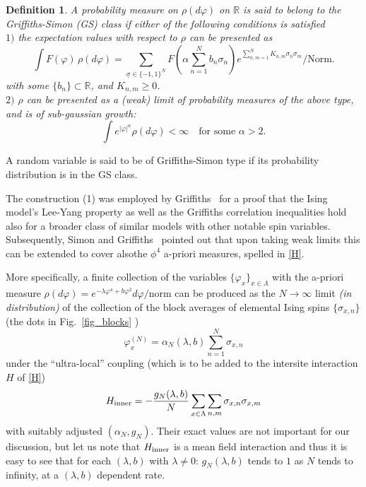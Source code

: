 \documentclass[a4paper,oneside,11pt]{article}
\def\R{\mathbb{R}}
\newtheorem{definition}[theorem]{Definition}
\newcommand{\be}[1]{\begin{equation}\label{#1}}
\newcommand{\ee}{\end{equation}}
\numberwithin{equation}{section}
\numberwithin{equation}{section}
\numberwithin{equation}{section}
\def\be{\begin{equation}}
\def\ee{\end{equation}}
\begin{document}
\begin{definition} \label{def:rho}
A probability measure on  $\rho(d\varphi) $ on $\R$ is said to belong to the Griffiths-Simon (GS) class if either  of the following conditions is satisfied 
\\  
\indent $1)$   the expectation values with respect to $\rho$ can be presented as 
\be 
\int F(\varphi) \, \rho(d\varphi)  =   \sum_{\underline{\sigma}\in \{-1,1\}^N} F(\alpha \sum_{n=1}^N b_n \sigma_n) e^{\sum_{n,m=1}^N  K_{n,m} \sigma_n \sigma_m} / \text{Norm.}
\ee 
with some $\{b_n\}\subset \R$, and $K_{n,m}  \geq 0$.   \\  
\indent $2) $   $\rho$ can be presented as a (weak) limit of probability measures of  the above type, and is of sub-gaussian growth: 
\be \label{sub_gauss}
\int e^{|\varphi |^\alpha} \rho(d \varphi ) < \infty \quad \mbox{for some $\alpha> 2$.}
\ee 
\end{definition} 
A random variable is said to be of  Griffiths-Simon type if its probability distribution is in the GS class.   



The construction  (1) was employed  by 
Griffiths~\cite{Gri69} 
for a proof  that the Ising model's Lee-Yang property as well as the Griffiths correlation inequalities hold also for a broader class of similar models with other notable spin variables.  Subsequently, Simon and Griffiths~\cite{SimGri73} pointed out that upon taking weak limits this can be extended to cover alsothe $\phi^4$ a-priori  measures, spelled in \eqref{H}.  

More specifically, a finite collection of the variables $\{\varphi_x\}_{x\in \Lambda}$ with the a-priori measure $\rho(d\varphi) = e^{-\lambda \varphi^4 + b\varphi^2} d\varphi/\text{norm} $   
can be produced as the $N\to \infty$ limit \emph{(in distribution)}  of the collection of the block averages of elemental Ising spins $\{\sigma_{x,n}\}$ (the dots  in Fig.~\ref{fig_blocks} )
\be
\varphi_x^{(N)} =   \alpha_N(\lambda, b) \sum_{n=1}^N \sigma_{x,n}
\ee 
 under the ``ultra-local'' coupling (which is to be added to the intersite interaction $H$ of \eqref{H})  
\be
H_{\rm inner}  = -  \frac{g_N(\lambda,b)}{N }  \sum_{x\in \Lambda} 
\sum_{n,m} \sigma_{x,n} \sigma_{x,m}
\ee 
with suitably adjusted $(\alpha_N, g_N)$.  Their exact values are not important for our discussion, but let us note that   $H_{\rm inner}$ is a mean field interaction and thus it is easy to see that for each 
$(\lambda,b)$ with $\lambda \neq 0$: 
$g_{N} (\lambda,b)$ tends to $1$ as $N$ tends to infinity, at a $(\lambda,b)$ dependent rate.  
\end{document}
